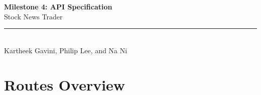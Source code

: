 \documentclass[11pt]{article}
\begin{document}
\thispagestyle{empty}
\begin{center}
    \vspace*{3cm}
    {\LARGE\bfseries\color{accent} Milestone 4: API Specification}\\[0.5em]
    {\Large Stock News Trader}\\[0.8em]
    \textcolor{accent}{\rule{0.6\textwidth}{1pt}}\\[1em]
    {\large Kartheek Gavini, Philip Lee, and Na Ni}
\end{center}

\vfill

\newpage
\section{Routes Overview}
\end{document}
